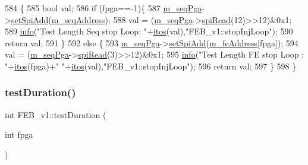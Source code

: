 \begin{DoxyCode}
584                                 \{
585   \textcolor{keywordtype}{bool} val;
586   \textcolor{keywordflow}{if} (fpga==-1)\{
587     \hyperlink{classFEB__v1_a6c7804ac86796f233a8393043adf2e77}{m\_seqPga}->\hyperlink{classSeqPGA_ac998ce3a6d9b5f2e88cc8393f8c1df53}{setSpiAdd}(\hyperlink{classFEB__v1_a1c1eb093fd1733b9510fcf8bc5c7ad08}{m\_seqAddress});
588     val = (\hyperlink{classFEB__v1_a6c7804ac86796f233a8393043adf2e77}{m\_seqPga}->\hyperlink{classSeqPGA_ab3d0e5e5d4014bc7a92588a76b8713d4}{spiRead}(12)>>12)&0x1;
589     \hyperlink{classObject_a644fd329ea4cb85f54fa6846484b84a8}{info}(\textcolor{stringliteral}{"Test Length Seq stop Loop: "}+\hyperlink{Tools_8h_af330027dbdafb9a30768b3613c553e60}{itos}(val),\textcolor{stringliteral}{"FEB\_v1::stopInjLoop"});
590     \textcolor{keywordflow}{return} val;
591   \}
592   \textcolor{keywordflow}{else} \{
593     \hyperlink{classFEB__v1_a6c7804ac86796f233a8393043adf2e77}{m\_seqPga}->\hyperlink{classSeqPGA_ac998ce3a6d9b5f2e88cc8393f8c1df53}{setSpiAdd}(\hyperlink{classFEB__v1_a4e1945c2d5b434125f375e9d0fc6d99f}{m\_feAddress}[fpga]);
594     val = (\hyperlink{classFEB__v1_a6c7804ac86796f233a8393043adf2e77}{m\_seqPga}->\hyperlink{classSeqPGA_ab3d0e5e5d4014bc7a92588a76b8713d4}{spiRead}(3)>>12)&0x1;
595     \hyperlink{classObject_a644fd329ea4cb85f54fa6846484b84a8}{info}(\textcolor{stringliteral}{"Test Length FE stop Loop : "}+\hyperlink{Tools_8h_af330027dbdafb9a30768b3613c553e60}{itos}(fpga)+\textcolor{stringliteral}{" "}+\hyperlink{Tools_8h_af330027dbdafb9a30768b3613c553e60}{itos}(val),\textcolor{stringliteral}{"FEB\_v1::stopInjLoop"});
596     \textcolor{keywordflow}{return} val;
597   \}
598 \}
\end{DoxyCode}
\mbox{\label{classFEB__v1_a7f1db8ca9490172fce7603da9e703dec}} 
\subsubsection{\texorpdfstring{test\+Duration()}{testDuration()}}
{\footnotesize\ttfamily int F\+E\+B\+\_\+v1\+::test\+Duration (\begin{DoxyParamCaption}\item[{int}]{fpga }\end{DoxyParamCaption})}



